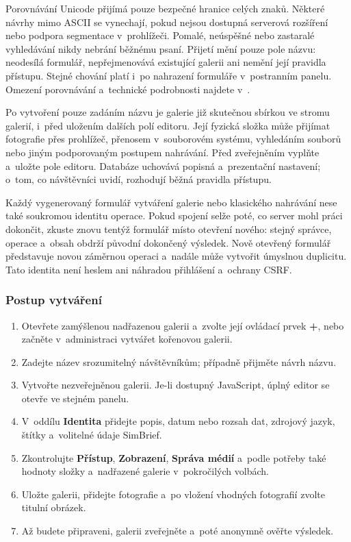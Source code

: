 \documentclass[11pt,a4paper]{article}
\newcommand{\filepath}[1]{\path{#1}}
\newcommand{\ui}[1]{\textbf{#1}}
\begin{document}
Porovnávání Unicode přijímá pouze bezpečné hranice celých znaků. Některé návrhy
mimo ASCII se vynechají, pokud nejsou dostupná serverová rozšíření nebo podpora
segmentace v~prohlížeči. Pomalé, neúspěšné nebo zastaralé vyhledávání nikdy
nebrání běžnému psaní. Přijetí mění pouze pole názvu: neodesílá formulář,
nepřejmenovává existující galerii ani nemění její pravidla přístupu. Stejné
chování platí i~po nahrazení formuláře v~postranním panelu. Omezení porovnávání
a~technické podrobnosti najdete v~\filepath{docs/TITLE_COMPLETION.md}.

Po vytvoření pouze zadáním názvu je galerie již skutečnou sbírkou ve stromu
galerií, i~před uložením dalších polí editoru. Její fyzická složka může přijímat
fotografie přes prohlížeč, přenosem v~souborovém systému, vyhledáním souborů
nebo jiným podporovaným postupem nahrávání. Před zveřejněním vyplňte a~uložte
pole editoru. Databáze uchovává popisná a~prezentační nastavení; o~tom, co
návštěvníci uvidí, rozhodují běžná pravidla přístupu.

Každý vygenerovaný formulář vytváření galerie nebo klasického nahrávání nese
také soukromou identitu operace. Pokud spojení selže poté, co server mohl práci
dokončit, zkuste znovu tentýž formulář místo otevření nového: stejný správce,
operace a~obsah obdrží původní dokončený výsledek. Nově otevřený formulář
představuje novou záměrnou operaci a~nadále může vytvořit úmyslnou duplicitu.
Tato identita není heslem ani náhradou přihlášení a~ochrany CSRF.

\subsubsection{Postup vytváření}

\begin{enumerate}
  \item Otevřete zamýšlenou nadřazenou galerii a~zvolte její ovládací prvek
  \ui{+}, nebo začněte v~administraci vytvářet kořenovou galerii.
  \item Zadejte název srozumitelný návštěvníkům; případně přijměte návrh názvu.
  \item Vytvořte nezveřejněnou galerii. Je-li dostupný JavaScript, úplný editor
  se otevře ve stejném panelu.
  \item V~oddílu \ui{Identita} přidejte popis, datum nebo rozsah dat, zdrojový
  jazyk, štítky a~volitelné údaje SimBrief.
  \item Zkontrolujte \ui{Přístup}, \ui{Zobrazení}, \ui{Správa médií} a~podle
  potřeby také hodnoty složky a~nadřazené galerie v~pokročilých volbách.
  \item Uložte galerii, přidejte fotografie a~po vložení vhodných fotografií
  zvolte titulní obrázek.
  \item Až budete připraveni, galerii zveřejněte a~poté anonymně ověřte
  výsledek.
\end{enumerate}
\end{document}
